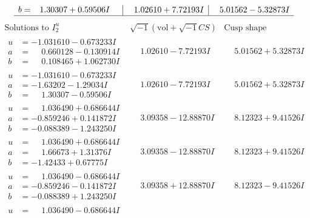\documentclass[1p]{elsarticle_modified}
\theoremstyle{definition}
\newcommand{\I}{\sqrt{-1}}
\begin{document}
$$\begin{array}{c|c|c}
\begin{aligned}
b &= \phantom{-}1.30307 + 0.59506 I\end{aligned}
 & \phantom{-}1.02610 + 7.72193 I & \phantom{-}5.01562 - 5.32873 I\\
 \hline 
 \end{array}$$\newpage$$\begin{array}{c|c|c}  
\text{Solutions to }I^u_{2}& \I (\text{vol} + \sqrt{-1}CS) & \text{Cusp shape}\\
 \hline 
\begin{aligned}
u &= -1.031610 - 0.673233 I \\
a &= \phantom{-}0.660128 - 0.130914 I \\
b &= \phantom{-}0.108465 + 1.062730 I\end{aligned}
 & \phantom{-}1.02610 - 7.72193 I & \phantom{-}5.01562 + 5.32873 I \\ \hline\begin{aligned}
u &= -1.031610 - 0.673233 I \\
a &= -1.63202 - 1.29034 I \\
b &= \phantom{-}1.30307 - 0.59506 I\end{aligned}
 & \phantom{-}1.02610 - 7.72193 I & \phantom{-}5.01562 + 5.32873 I \\ \hline\begin{aligned}
u &= \phantom{-}1.036490 + 0.686644 I \\
a &= -0.859246 + 0.141872 I \\
b &= -0.088389 - 1.243250 I\end{aligned}
 & \phantom{-}3.09358 - 12.88870 I & \phantom{-}8.12323 + 9.41526 I \\ \hline\begin{aligned}
u &= \phantom{-}1.036490 + 0.686644 I \\
a &= \phantom{-}1.66673 + 1.31376 I \\
b &= -1.42433 + 0.67775 I\end{aligned}
 & \phantom{-}3.09358 - 12.88870 I & \phantom{-}8.12323 + 9.41526 I \\ \hline\begin{aligned}
u &= \phantom{-}1.036490 - 0.686644 I \\
a &= -0.859246 - 0.141872 I \\
b &= -0.088389 + 1.243250 I\end{aligned}
 & \phantom{-}3.09358 + 12.88870 I & \phantom{-}8.12323 - 9.41526 I \\ \hline\begin{aligned}
u &= \phantom{-}1.036490 - 0.686644 I \\

\end{aligned}
\end{array}$$
\end{document}

